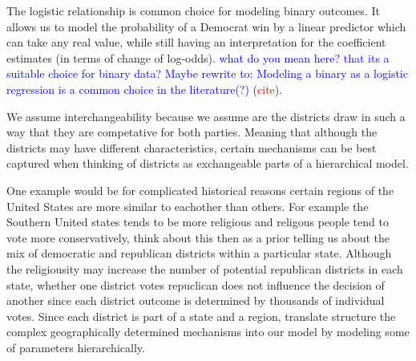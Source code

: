 \documentclass[12pt]{article}
\newcommand{\blue}[1]{\textcolor{blue}{#1}}
\begin{document}
The logistic relationship is common choice for modeling binary outcomes. It allows us to model the probability of a Democrat win by a linear predictor which can take any real value, while still having an interpretation for the coefficient estimates (in terms of change of log-odds).
\blue{what do you mean here? that its a suitable choice for binary data? Maybe rewrite to: Modeling a binary as a logistic regression is a common choice in the literature(?) } (\textcolor{red}{cite}).

We assume interchangeability because  we assume are the districts draw in such a way that they are competative for both parties. Meaning that although the districts may have different characteristics, certain mechanisms can be best captured when thinking of districts as exchangeable parts of  a hierarchical model. 

One example would be for complicated historical reasons certain regions of the United States are more similar to eachother than others. For example the Southern United states tends to be more religious and religous people tend to vote more conservatively, think about this then as a prior telling us about the mix of democratic and republican districts within a particular state. Although the religiousity may increase the number of potential republican districts in each state, whether one district votes repuclican does not influence the decision of another since each district outcome is determined by thousands of individual votes. 
Since each district is part of a state and a region, translate structure the complex geographically determined mechanisms into our model by modeling some of parameters hierarchically.

\end{document}
